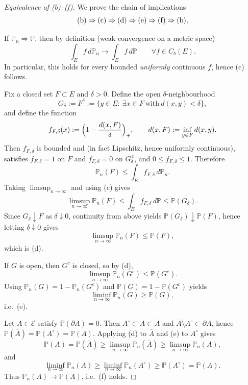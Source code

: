 \begin{proof}[Equivalence of \textnormal{(b)}--\textnormal{(f)}]
We prove the chain of implications
\[
\textnormal{(b)}\Rightarrow\textnormal{(c)}\Rightarrow\textnormal{(d)}\Rightarrow\textnormal{(e)}
\Rightarrow\textnormal{(f)}\Rightarrow\textnormal{(b)},
\]

\medskip
{}
If $\mathbb{P}_n\Rightarrow \mathbb{P}$, then by definition (weak convergence on a metric space)
\[
\int_E f\,d\mathbb{P}_n \to \int_E f\,d\mathbb{P}\qquad\forall f\in C_b(E).
\]
In particular, this holds for every bounded \emph{uniformly} continuous $f$, hence \textnormal{(c)} follows. 

\medskip
{}
Fix a closed set $F\subset E$ and $\delta>0$. Define the open $\delta$-neighbourhood
\[
G_\delta := F^\delta := \{y\in E:\ \exists x\in F\ \text{with}\ d(x,y)<\delta\},
\]
and define the function
\[
f_{F,\delta}(x):=\Bigl(1-\frac{d(x,F)}{\delta}\Bigr)_+,
\qquad d(x,F):=\inf_{y\in F} d(x,y).
\]
Then $f_{F,\delta}$ is bounded and (in fact Lipschitz, hence uniformly continuous), satisfies
$f_{F,\delta}=1$ on $F$ and $f_{F,\delta}=0$ on $G_\delta^{\,c}$, and $0\le f_{F,\delta}\le 1$.
Therefore
\[
\mathbb{P}_n(F)\le \int_E f_{F,\delta}\,d\mathbb{P}_n.
\]
Taking $\limsup_{n\to\infty}$ and using \textnormal{(c)} gives
\[
\limsup_{n\to\infty}\mathbb{P}_n(F)
\le \int_E f_{F,\delta}\,d\mathbb{P}
\le \mathbb{P}(G_\delta).
\]
Since $G_\delta\downarrow F$ as $\delta\downarrow 0$, continuity from above yields
$\mathbb{P}(G_\delta)\downarrow \mathbb{P}(F)$, hence letting $\delta\downarrow 0$ gives
\[
\limsup_{n\to\infty}\mathbb{P}_n(F)\le \mathbb{P}(F),
\]
which is \textnormal{(d)}. 

\medskip
{}
If $G$ is open, then $G^c$ is closed, so by \textnormal{(d)},
\[
\limsup_{n\to\infty}\mathbb{P}_n(G^c)\le \mathbb{P}(G^c).
\]
Using $\mathbb{P}_n(G)=1-\mathbb{P}_n(G^c)$ and $\mathbb{P}(G)=1-\mathbb{P}(G^c)$ yields
\[
\liminf_{n\to\infty}\mathbb{P}_n(G)\ge \mathbb{P}(G),
\]
i.e.\ \textnormal{(e)}. 

\medskip
{}
Let $A\in\mathcal{E}$ satisfy $\mathbb{P}(\partial A)=0$. Then $A^\circ\subset A\subset \overline{A}$
and $\overline{A}\setminus A^\circ\subset \partial A$, hence
$\mathbb{P}(\overline{A})=\mathbb{P}(A^\circ)=\mathbb{P}(A)$.
Applying \textnormal{(d)} to $\overline{A}$ and \textnormal{(e)} to $A^\circ$ gives
\[
\mathbb{P}(A)=\mathbb{P}(\overline{A}) \ge \limsup_{n\to\infty}\mathbb{P}_n(\overline{A})
\ge \limsup_{n\to\infty}\mathbb{P}_n(A),
\]
and
\[
\liminf_{n\to\infty}\mathbb{P}_n(A)\ge \liminf_{n\to\infty}\mathbb{P}_n(A^\circ)
\ge \mathbb{P}(A^\circ)=\mathbb{P}(A).
\]
Thus $\mathbb{P}_n(A)\to \mathbb{P}(A)$, i.e.\ \textnormal{(f)} holds. 


\end{proof}
